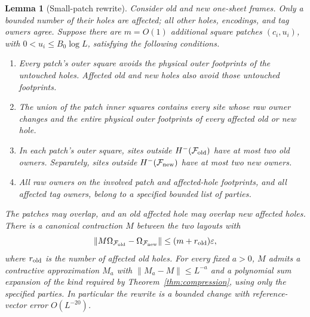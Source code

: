 \documentclass[11pt]{article}
\numberwithin{equation}{section}
\newtheorem{lemma}[theorem]{Lemma}
\theoremstyle{definition}
\theoremstyle{remark}
\newcommand{\norm}[1]{\lVert #1\rVert}
\begin{document}
\begin{lemma}[Small-patch rewrite]\label{lem:small-rewrite}
Consider old and new one-sheet frames.  Only a bounded number of their holes
are affected; all other holes, encodings, and tag owners agree.  Suppose
there are $m=O(1)$ additional square patches $(c_i,u_i)$, with
$0<u_i\le B_0\log L$, satisfying the following conditions.
\begin{enumerate}
\item Every patch's outer square avoids the physical outer footprints of
the untouched holes.  Affected old and new holes also avoid those
untouched footprints.
\item The union of the patch inner squares contains every site whose raw
owner changes and the entire physical outer footprints of every affected
old or new hole.
\item In each patch's outer square, sites outside $H^-(\mathcal F_{\rm old})$
have at most two old owners.  Separately, sites outside
$H^-(\mathcal F_{\rm new})$ have at most two new owners.
\item All raw owners on the involved patch and affected-hole footprints,
and all affected tag owners, belong to a specified bounded list of parties.
\end{enumerate}
The patches may overlap, and an old affected hole may overlap new affected
holes.  There is a canonical contraction $M$ between the two layouts with
\begin{equation}\label{eq:rewrite-reference-error}
 \norm{M\Omega_{\mathcal F_{\rm old}}-
                   \Omega_{\mathcal F_{\rm new}}}
       \le(m+r_{\rm old})\varepsilon,
\end{equation}
where $r_{\rm old}$ is the number of affected old holes.  For every fixed
$a>0$, $M$ admits a contractive approximation $M_a$ with
$\norm{M_a-M}\le L^{-a}$ and a polynomial sum expansion of the kind required
by Theorem~\ref{thm:compression}, using only the specified parties.  In
particular the rewrite is a bounded change with reference-vector error
$O(L^{-20})$.
\end{lemma}
\end{document}
